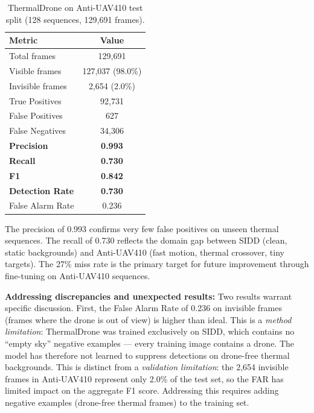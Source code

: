 \documentclass[12pt,a4paper]{report}
\begin{document}
\begin{table}[H]
\centering
\caption{ThermalDrone on Anti-UAV410 test split (128 sequences, 129,691 frames).}
\label{tab:antiuav410}
\begin{tabular}{|l|c|}
\hline
\textbf{Metric} & \textbf{Value} \\
\hline
Total frames      & 129,691 \\
\hline
Visible frames    & 127,037 (98.0\%) \\
\hline
Invisible frames  & 2,654 (2.0\%) \\
\hline
True Positives    & 92,731 \\
\hline
False Positives   & 627 \\
\hline
False Negatives   & 34,306 \\
\hline
\textbf{Precision}       & \textbf{0.993} \\
\hline
\textbf{Recall}          & \textbf{0.730} \\
\hline
\textbf{F1}              & \textbf{0.842} \\
\hline
\textbf{Detection Rate}  & \textbf{0.730} \\
\hline
False Alarm Rate  & 0.236 \\
\hline
\end{tabular}
\end{table}

The precision of 0.993 confirms very few false positives on unseen thermal
sequences. The recall of 0.730 reflects the domain gap between SIDD (clean,
static backgrounds) and Anti-UAV410 (fast motion, thermal crossover, tiny
targets). The 27\% miss rate is the primary target for future improvement
through fine-tuning on Anti-UAV410 sequences.

\textbf{Addressing discrepancies and unexpected results:}
Two results warrant specific discussion. First, the False Alarm Rate of 0.236
on invisible frames (frames where the drone is out of view) is higher than
ideal. This is a \textit{method limitation}: ThermalDrone was trained
exclusively on SIDD, which contains no ``empty sky'' negative examples ---
every training image contains a drone. The model has therefore not learned
to suppress detections on drone-free thermal backgrounds. This is distinct
from a \textit{validation limitation}: the 2,654 invisible frames in
Anti-UAV410 represent only 2.0\% of the test set, so the FAR has limited
impact on the aggregate F1 score. Addressing this requires adding negative
examples (drone-free thermal frames) to the training set.
\end{document}
